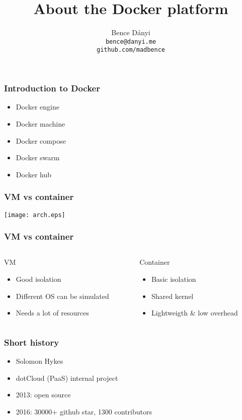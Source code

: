 \documentclass[xetex,mathserif,serif]{beamer}
\title{About the Docker platform}
\author{Bence Dányi\\\vspace{1cm}\tiny{\texttt{bence@danyi.me\\github.com/madbence}}}
\begin{document}
  \frame{\titlepage}
  \begin{frame}
    \frametitle{Introduction to Docker}
    \begin{itemize}
      \item Docker engine
      \item Docker machine
      \item Docker compose
      \item Docker swarm
      \item Docker hub
    \end{itemize}
  \end{frame}
  \begin{frame}
    \frametitle{VM vs container}
    \texttt{[image: arch.eps]}
  \end{frame}
  \begin{frame}
    \frametitle{VM vs container}
    \begin{columns}
      \begin{column}{0.5\textwidth}
        VM
        \begin{itemize}
          \item Good isolation
          \item Different OS can be simulated
          \item Needs a lot of resources
        \end{itemize}
      \end{column}
      \begin{column}{0.5\textwidth}
        Container
        \begin{itemize}
          \item Basic isolation
          \item Shared kernel
          \item Lightweigth \& low overhead
        \end{itemize}
      \end{column}
    \end{columns}
  \end{frame}
  \begin{frame}
    \frametitle{Short history}
    \begin{itemize}
      \item Solomon Hykes
      \item dotCloud (PaaS) internal project
      \item 2013: open source
      \item 2016: 30000+ github star, 1300 contributors
    \end{itemize}
  \end{frame}
\end{document}
